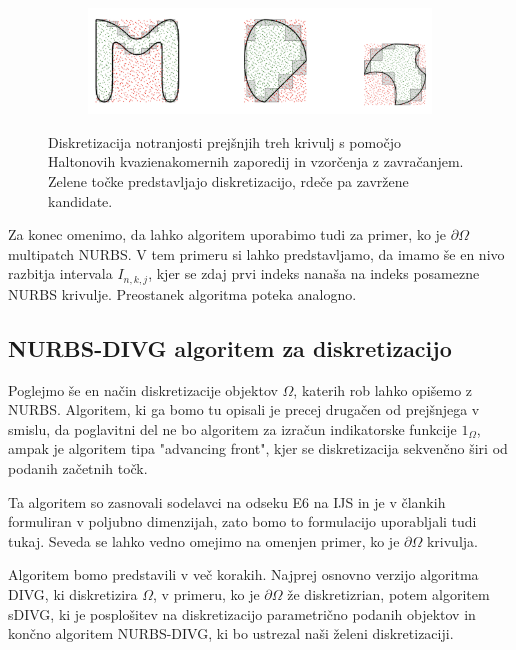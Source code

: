 \documentclass{article}
\begin{document}
\begin{figure}[H]
\centering
\begin{subfigure}{.8\textwidth}
\includegraphics[width=\linewidth]{Slike/inRS_rezultat.png}
\end{subfigure}
\caption{Diskretizacija notranjosti prejšnjih treh krivulj s pomočjo Haltonovih kvazienakomernih zaporedij in vzorčenja z zavračanjem. Zelene točke predstavljajo diskretizacijo, rdeče pa zavržene kandidate.}
\label{fig:inRSrezultat}
\end{figure}
Za konec omenimo, da lahko algoritem uporabimo tudi za primer, ko je $\partial \Omega$ multipatch NURBS. V tem primeru si lahko predstavljamo, da imamo še en nivo razbitja intervala $I_{n,k,j}$, kjer se zdaj prvi indeks nanaša na indeks posamezne NURBS krivulje. Preostanek algoritma poteka analogno.
\subsection{NURBS-DIVG algoritem za diskretizacijo}
Poglejmo še en način diskretizacije objektov $\Omega$, katerih rob lahko opišemo z NURBS. Algoritem, ki ga bomo tu opisali je precej drugačen od prejšnjega v smislu, da poglavitni del ne bo algoritem za izračun indikatorske funkcije $1_\Omega$, ampak je algoritem tipa "advancing front", kjer se diskretizacija sekvenčno širi od podanih začetnih točk.

Ta algoritem so zasnovali sodelavci na odseku E6 na IJS in je v člankih formuliran v poljubno dimenzijah, zato bomo to formulacijo uporabljali tudi tukaj. Seveda se lahko vedno omejimo na omenjen primer, ko je $\partial \Omega$ krivulja.

Algoritem bomo predstavili v več korakih. Najprej osnovno verzijo algoritma DIVG, ki diskretizira $\Omega$, v primeru, ko je $\partial \Omega$ že diskretizrian, potem algoritem sDIVG, ki je posplošitev na diskretizacijo parametrično podanih objektov in končno algoritem NURBS-DIVG, ki bo ustrezal naši želeni diskretizaciji.
\end{document}
